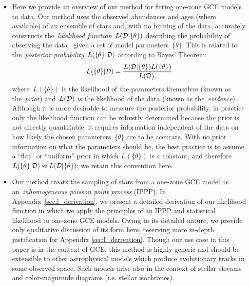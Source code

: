 \documentclass[ms.tex]{subfiles}
\begin{document}
\begin{itemize}

	\item Here we provide an overview of our method for fitting one-zone GCE
	models to data.
	Our method uses the observed abundances and ages (where available) of an
	ensemble of stars and, with no binning of the data, accurately constructs
	the~\textit{likelihood function}~$L(\mathcal{D} | \{\theta\})$ describing
	the probability of observing the data~ given a set of model
	parameters~$\{\theta\}$.
	This is related to the~\textit{posterior probability}~$L(\{\theta\} |
	\mathcal{D})$ according to Bayes' Theorem:
	\begin{equation}
	L(\{\theta\} | \mathcal{D}) = \frac{
		L(\mathcal{D} | \{\theta\}) L(\{\theta\})
	}{
		L(\mathcal{D}),
	}
	\end{equation}
	where~$L(\{\theta\})$ is the likelihood of the parameters themselves
	(known as the~\textit{prior}) and~$L(\mathcal{D})$ is the likelihood of the
	data (known as the~\textit{evidence}).
	Although it is more desirable to measure the posterior probability,
	in practice only the likelihood function can be robustly determined
	because the prior is not directly quantifiable; it requires information
	independent of the data on how likely the chosen parameters~$\{\theta\}$
	are to be accurate.
	With no prior information on what the parameters should be, the best
	practice is to assume a ``flat'' or ``uniform'' prior in which
	$L(\{\theta\})$ is a constant, and therefore
	$L(\{\theta\} | \mathcal{D}) \approx L(\mathcal{D} | \{\theta\})$; we retain
	this convention here.

	\item Our method treats the sampling of stars from a one-zone GCE model
	as an~\textit{inhomogeneous poisson point process} (IPPP).
	In Appendix~\ref{sec:l_derivation}, we present a detailed derivation of
	our likelihood function in which we apply the principles of an IPPP and
	statistical likelihood to one-zone GCE models.
	Owing to its detailed nature, we provide only qualitative discussion of
	its form here, reserving more in-depth justification for Appendix
	\ref{sec:l_derivation}.
	Though our use case in this paper is in the context of GCE, this method
	is highly generic and should be extensible to other astrophysical models
	which produce evolutionary tracks in some observed space.
	Such models arise also in the context of stellar streams and
	color-magnitude diagrams (i.e. stellar isochrones).


\end{itemize}
\end{document}
